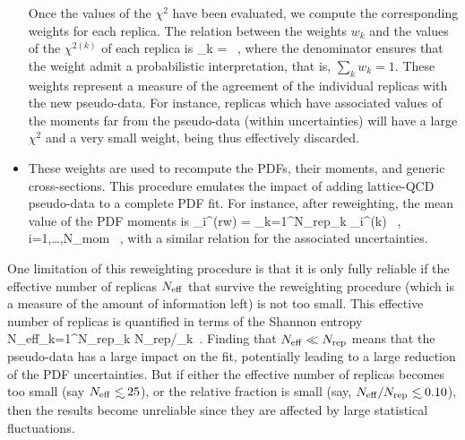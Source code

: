 \begin{itemize}
  
  Once the values of the $\chi^2$ have been evaluated,
  we compute the corresponding weights for each replica.
  The relation between the weights $w_k$  and the values of
  the $\chi^{2(k)}$ of each replica is
  \be
  \omega_k = \, ,
  \ee
  where the denominator ensures that the weight admit
  a probabilistic interpretation, that is, $\sum_k w_k=1$.
  These weights represent a measure of the agreement of the individual replicas with the new pseudo-data.
  For instance, replicas which have associated values
  of the moments far from the pseudo-data (within uncertainties) will
  have  a large $\chi^2$ and a very small weight, being thus effectively discarded.
\item These weights are used to recompute the PDFs, their moments,
  and generic cross-sections.
  This procedure emulates the
  impact of adding lattice-QCD pseudo-data to a complete PDF fit.
  For instance, after reweighting, the mean value of
  the PDF moments is
   \be
  \label{eq:pseudodatadef1}
  _i^{\rm (rw)} = \sum_{k=1}^{N_{\rm rep}}\omega_k
  _i^{\rm (k)} \, , \quad i=1,\ldots,N_{\rm mom} \, ,
  \ee
  with a similar relation for the associated uncertainties.
\end{itemize}

One limitation of this reweighting procedure is that it is only fully 
 reliable if the 
  effective number of replicas $N_{\rm eff}$ that survive the reweighting
  procedure (which is a measure of the amount
  of information left) is not too small.
  This effective number of replicas
    is quantified in terms of the Shannon entropy
    \be
    \label{eq:effnrep}
    N_{\rm eff}\equiv \exp\lc {}\sum_{k=1}^{N_{\rm rep}}\omega_k
    \log \lp N_{\rm rep}/\omega_k\rp\rc \, .
    \ee
    Finding that $N_{\rm eff}\ll N_{\rm rep}$ means that the pseudo-data
    has a large impact on the fit, potentially leading to a large
    reduction of the PDF uncertainties.
    But if either the effective number of replicas becomes too
    small (say $N_{\rm eff}\lsim 25$), 
    or the relative fraction is small (say, $N_{\rm eff}/N_{\rm rep}\lsim 0.10$),
then the results
    become unreliable since they are affected by large
    statistical fluctuations.

